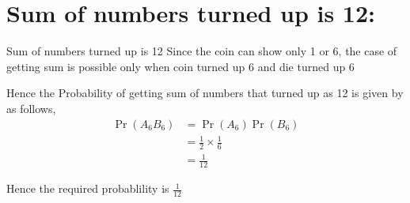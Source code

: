\documentclass{beamer}
\providecommand{\pr}[1]{\ensuremath{\Pr\left(#1\right)}}
\begin{document}
\section{Sum of numbers turned up is 12:}
\begin{frame}{Sum of numbers turned up is 12}
Since the coin can show only 1 or 6, the case of getting sum is possible only when coin turned up 6 and die turned up 6 \newline

Hence the Probability of getting sum of numbers that turned up as 12 is given by as follows,
\begin{align}
	\pr{A_6B_6} &= \pr{A_6} \pr{B_6} \\
	&= \frac{1}{2} \times \frac{1}{6} \\
	&= \frac{1}{12}
\end{align}
\begin{block}{}
Hence the required probablility is $\frac{1}{12}$
\end{block}
\end{frame}

\end{document}
